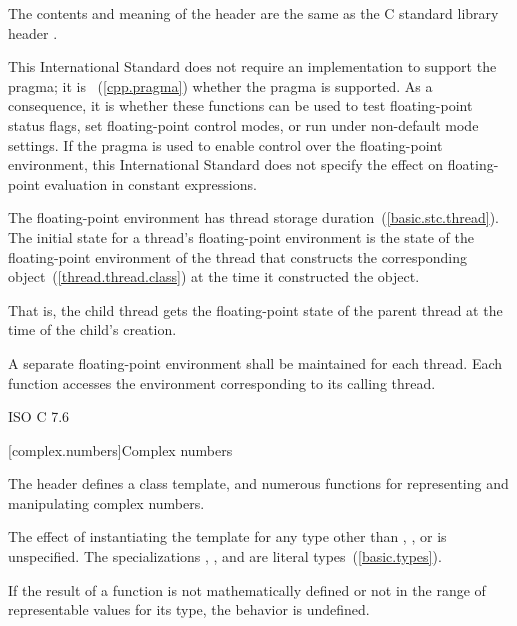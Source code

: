 \pnum
The contents and meaning of the header 
are the same as the C standard library header .
\begin{note}
This International Standard does not require an implementation to support the
 pragma;
it is ~(\ref{cpp.pragma})
whether the pragma is supported. As a consequence,
it is 
whether these functions can be used to test floating-point status flags,
set floating-point control modes, or run under non-default mode settings.
If the pragma is used to enable control over the floating-point environment,
this International Standard does not specify the effect on
floating-point evaluation in constant expressions.
\end{note}

\pnum
The floating-point environment has thread storage
duration~(\ref{basic.stc.thread}). The initial state for a thread's floating-point
environment is the state of the floating-point environment of the thread that constructs
the corresponding  object~(\ref{thread.thread.class}) at the time it
constructed the object. \begin{note} That is, the child thread gets the floating-point
state of the parent thread at the time of the child's creation. \end{note}

\pnum
A separate floating-point environment shall be maintained for each thread. Each function
accesses the environment corresponding to its calling thread.

\xref ISO C 7.6

[complex.numbers]{Complex numbers}

\pnum
The header
%
defines a
class template,
and numerous functions for representing and manipulating complex numbers.

\pnum
The effect of instantiating the template
for any type other than , , or  is unspecified.
The specializations
,
, and
 are literal types~(\ref{basic.types}).

\pnum
If the result of a function is not mathematically defined or not in
the range of representable values for its type, the behavior is
undefined.

